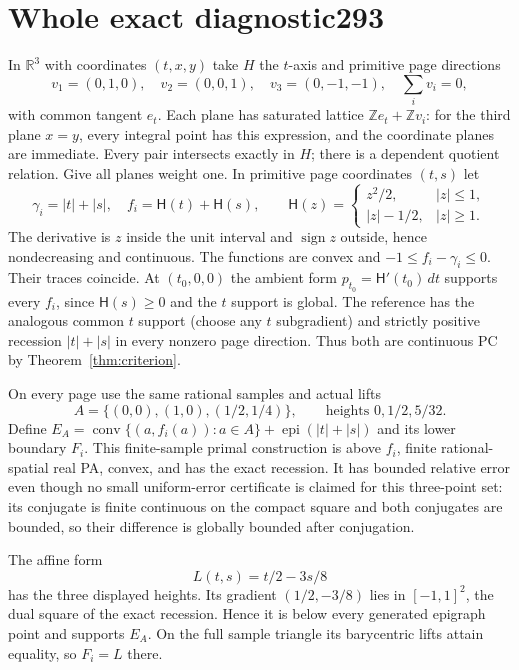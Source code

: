 \documentclass[11pt]{article}
\newcommand{\R}{\mathbb R}
\newcommand{\Z}{\mathbb Z}
\newcommand{\epi}{\operatorname{epi}}
\newcommand{\conv}{\operatorname{conv}}
\begin{document}
\section{Whole exact diagnostic293}\label{sec:diagnostic}
In $\R^3$ with coordinates $(t,x,y)$ take $H$ the $t$-axis and primitive page directions
\[
 v_1=(0,1,0),\quad v_2=(0,0,1),\quad v_3=(0,-1,-1),\quad\sum_i v_i=0,
\]
with common tangent $e_t$. Each plane has saturated lattice $\Z e_t+\Z v_i$: for the third plane $x=y$, every integral point has this expression, and the coordinate planes are immediate. Every pair intersects exactly in $H$; there is a dependent quotient relation. Give all planes weight one. In primitive page coordinates $(t,s)$ let
\[
 \gamma_i=|t|+|s|,\quad f_i=\mathsf H(t)+\mathsf H(s),\qquad
 \mathsf H(z)=\begin{cases}z^2/2,&|z|\leq1,\\|z|-1/2,&|z|\geq1.\end{cases}
\]
The derivative is $z$ inside the unit interval and $\operatorname{sign}z$ outside, hence nondecreasing and continuous. The functions are convex and $-1\leq f_i-\gamma_i\leq0$. Their traces coincide. At $(t_0,0,0)$ the ambient form $p_{t_0}=\mathsf H'(t_0)\,dt$ supports every $f_i$, since $\mathsf H(s)\geq0$ and the $t$ support is global. The reference has the analogous common $t$ support (choose any $t$ subgradient) and strictly positive recession $|t|+|s|$ in every nonzero page direction. Thus both are continuous PC by Theorem~\ref{thm:criterion}.

On every page use the same rational samples and actual lifts
\[
 A=\{(0,0),(1,0),(1/2,1/4)\},\qquad\text{heights }0,1/2,5/32.
\]
Define $E_A=\conv\{(a,f_i(a)):a\in A\}+\epi(|t|+|s|)$ and its lower boundary $F_i$. This finite-sample primal construction is above $f_i$, finite rational-spatial real PA, convex, and has the exact recession. It has bounded relative error even though no small uniform-error certificate is claimed for this three-point set: its conjugate is finite continuous on the compact square and both conjugates are bounded, so their difference is globally bounded after conjugation.

The affine form
\[
 L(t,s)=t/2-3s/8
\]
has the three displayed heights. Its gradient $(1/2,-3/8)$ lies in $[-1,1]^2$, the dual square of the exact recession. Hence it is below every generated epigraph point and supports $E_A$. On the full sample triangle its barycentric lifts attain equality, so $F_i=L$ there.
\end{document}
